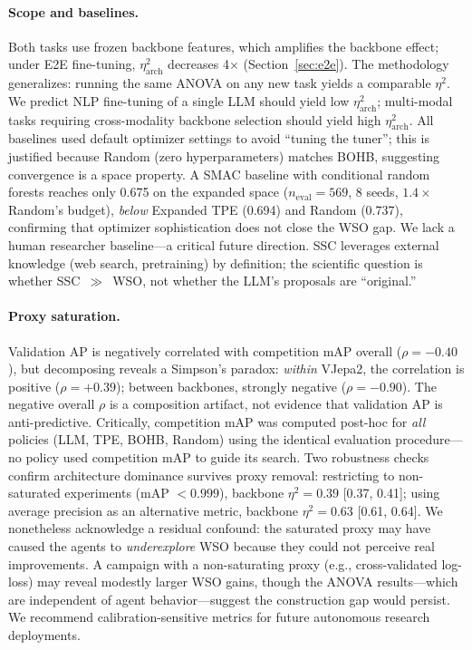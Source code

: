 \documentclass{article}
\begin{document}
\paragraph{Scope and baselines.}
Both tasks use frozen backbone features, which amplifies the backbone effect; under E2E fine-tuning, $\eta^2_{\text{arch}}$ decreases 4$\times$ (Section~\ref{sec:e2e}).
The methodology generalizes: running the same ANOVA on any new task yields a comparable $\eta^2$.
We predict NLP fine-tuning of a single LLM should yield low $\eta^2_{\mathrm{arch}}$; multi-modal tasks requiring cross-modality backbone selection should yield high $\eta^2_{\mathrm{arch}}$.
All baselines used default optimizer settings to avoid ``tuning the tuner''; this is justified because Random (zero hyperparameters) matches BOHB, suggesting convergence is a space property.
A SMAC baseline with conditional random forests reaches only 0.675 on the expanded space ($n_{\mathrm{eval}} = 569$, 8 seeds, $1.4\times$ Random's budget), \emph{below} Expanded TPE (0.694) and Random (0.737), confirming that optimizer sophistication does not close the WSO gap. We lack a human researcher baseline---a critical future direction.
SSC leverages external knowledge (web search, pretraining) by definition; the scientific question is whether SSC~$\gg$~WSO, not whether the LLM's proposals are ``original.''

\paragraph{Proxy saturation.}
Validation AP is negatively correlated with competition mAP overall ($\rho = -0.40$), but decomposing reveals a Simpson's paradox: \emph{within} VJepa2, the correlation is positive ($\rho = +0.39$); between backbones, strongly negative ($\rho = -0.90$). The negative overall $\rho$ is a composition artifact, not evidence that validation AP is anti-predictive.
Critically, competition mAP was computed post-hoc for \emph{all} policies (LLM, TPE, BOHB, Random) using the identical evaluation procedure---no policy used competition mAP to guide its search.
Two robustness checks confirm architecture dominance survives proxy removal: restricting to non-saturated experiments (mAP $< 0.999$), backbone $\eta^2 = 0.39$ [0.37, 0.41]; using average precision as an alternative metric, backbone $\eta^2 = 0.63$ [0.61, 0.64].
We nonetheless acknowledge a residual confound: the saturated proxy may have caused the agents to \emph{underexplore} WSO because they could not perceive real improvements. A campaign with a non-saturating proxy (e.g., cross-validated log-loss) may reveal modestly larger WSO gains, though the ANOVA results---which are independent of agent behavior---suggest the construction gap would persist. We recommend calibration-sensitive metrics for future autonomous research deployments.
\end{document}
